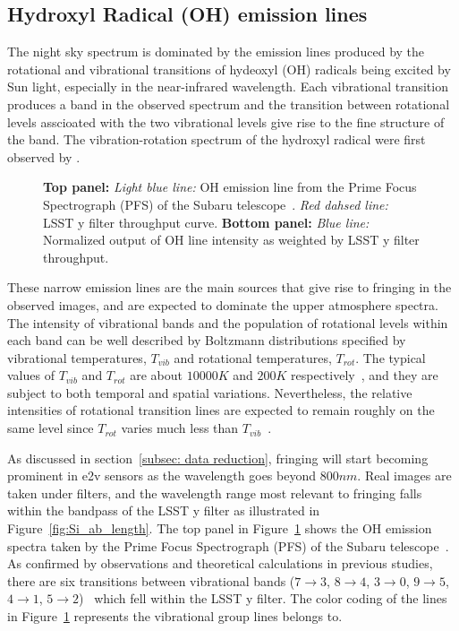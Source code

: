 \documentclass[twocolumn]{aastex63} %
\begin{document}
\begin{CJK*}{UTF8}{gbsn}
\subsection{Hydroxyl Radical (OH) emission lines}\label{sec: OH line + y filter}
 The night sky spectrum is dominated by the emission lines produced by the rotational and vibrational transitions of hydeoxyl (OH) radicals being excited by Sun light, especially in the near-infrared wavelength. Each vibrational transition produces a band in the observed spectrum and the transition between rotational levels asscioated with the two vibrational levels give rise to the fine structure of the band. The vibration-rotation spectrum of the hydroxyl radical were first observed by \citet{Meinel50a,Meinel50b}.
\begin{figure}[htb]
\centering
{}
\caption{\textbf{Top panel:} {\it Light blue line:} OH emission line from the Prime Focus Spectrograph (PFS) of the Subaru telescope~\citep{Tamura16}. {\it Red dahsed line:} LSST y filter throughput curve. 
\textbf{Bottom panel:} {\it Blue line:} Normalized output of OH line intensity as weighted by LSST y filter throughput.}
\label{fig:OH_spec}
\end{figure}
These narrow emission lines are the main sources that give rise to fringing in the observed images, and are expected to dominate the upper atmosphere spectra. The intensity of vibrational bands and the population of rotational levels within each band can be well described by Boltzmann distributions specified by vibrational temperatures, $T_{vib}$ and rotational temperatures, $T_{rot}$. The typical values of $T_{vib}$ and $T_{rot}$ are about $10000K$ and $200K$ respectively~\citep{Rousselot00}, and they are subject to both temporal and spatial variations.  Nevertheless, the relative intensities of rotational transition lines are expected to remain roughly on the same level since $T_{rot}$ varies much less than $T_{vib}$~\citep{Noll15,Hart19}.

As discussed in section~\ref{subsec: data reduction}, fringing will start becoming prominent in e2v sensors as the wavelength goes beyond $800nm$. Real images are taken under filters, and the wavelength range most relevant to fringing falls within the bandpass of the LSST y filter as illustrated in Figure~\ref{fig:Si_ab_length}. The top panel in Figure~\ref{fig:OH_spec} shows the OH emission spectra taken by the Prime Focus Spectrograph (PFS) \citep{rlh} of the Subaru telescope~\citep{Tamura16}. As confirmed by observations and theoretical calculations in previous studies, there are six transitions between vibrational bands ($7\rightarrow 3$, $8\rightarrow4$, $3\rightarrow0$, $9\rightarrow5$, $4\rightarrow1$, $5\rightarrow2$)~\citep{Noll15,Osterbrock96,Osterbrock97,Rousselot00} which fell within the LSST y filter. The color coding of the lines in Figure~\ref{fig:OH_spec} represents the vibrational group lines belongs to. 


\end{CJK*}
\end{document}
